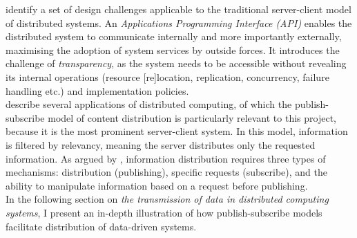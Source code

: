 \documentclass[../report.tex]{subfiles}
\begin{document}
\cite{kshemkalyani2011distributed} identify a set of design challenges applicable to the traditional server-client model of distributed systems. An \textit{Applications Programming Interface (API)} enables the distributed system to communicate internally and more importantly externally, maximising the adoption of system services by outside forces. It introduces the challenge of \textit{transparency}, as the system needs to be accessible without revealing its internal operations (resource [re]location, replication, concurrency, failure handling etc.) and implementation policies. \\

\cite{kshemkalyani2011distributed} describe several applications of distributed computing, of which the publish-subscribe model of content distribution is particularly relevant to this project, because it is the most prominent server-client system. In this model, information is filtered by relevancy, meaning the server distributes only the requested information. As argued by \cite{kshemkalyani2011distributed}, information distribution requires three types of mechanisms: distribution (publishing), specific requests (subscribe), and the ability to manipulate information based on a request before publishing. \\

In the following section on \textit{the transmission of data in distributed computing systems}, I present an in-depth illustration of how publish-subscribe models facilitate distribution of data-driven systems.


\end{document}
